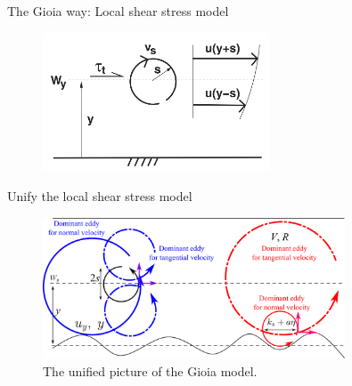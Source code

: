 \documentclass[10pt,xcolor={table,dvipsnames},t]{beamer}
\begin{document}
\begin{frame}{The Gioia way: Local shear stress model}
\begin{figure}[!htb]
\begin{minipage}{.5\textwidth}
            \label{fig:wall-shear}
        \end{minipage}%
        \begin{minipage}{0.5\textwidth}
            \centering
            \includegraphics[width=0.6\textwidth]{./figures/column-shear.png}
            \label{fig:column-shear}
        \end{minipage}
    \end{figure}
\end{frame}

\begin{frame}{Unify the local shear stress model}
    \begin{figure}[htpb]
        \centering
        \includegraphics[width=0.8\textwidth]{./figures/unify-gioia-model.pdf}
        \caption{The unified picture of the Gioia model.}
        \label{fig:-figures-unify-gioia-model-pdf}
    \end{figure}
\end{frame}
\end{document}
